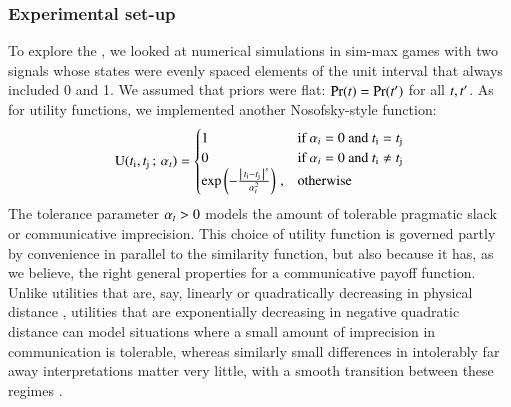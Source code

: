 \subsubsection{Experimental set-up}

To explore the \rdd, we looked at numerical simulations in sim-max
games with two signals whose states were evenly spaced elements of the
unit interval that always included 0 and 1. We assumed that priors
were flat: $\Pr(t) = \Pr(t')$ for all $t, t'$. As
for utility functions, we implemented another Nosofsky-style function:
\begin{align}
  \label{eq:NosofskyUtil}
  \mathrm{U}(t_{\mathrm{i}}, t_{\mathrm{j}} \thinspace ; \thinspace \alpha_t) =
      \begin{cases}
    1 & \textrm{if } \alpha_i = 0 \textrm{ and } t_{\mathrm{i}} = t_{\mathrm{j}} \\
    0 & \textrm{if } \alpha_i = 0 \textrm{ and } t_{\mathrm{i}} \neq t_{\mathrm{j}} \\
 \operatorname{exp} \left ( -  \frac{\left \lvert \, t_{\mathrm{i}} - t_{\mathrm{j}} \, \right\rvert^s}{ \alpha_t^2} \right ) \,,& \textrm{otherwise} \\
    \end{cases}
\end{align}
The tolerance parameter $\alpha_t > 0$ models the amount of tolerable
pragmatic slack or communicative imprecision. This choice of utility
function is governed partly by convenience in parallel to the
similarity function, but also because it has, as we believe, the right
general properties for a communicative payoff function. Unlike
utilities that are, say, linearly or quadratically decreasing in
physical distance \citep[as used
by][]{JagerMetzger2011:Voronoi-Languag,FrankeJager2010:Vagueness-Signa},
utilities that are exponentially decreasing in negative quadratic
distance can model situations where a small amount of imprecision in
communication is tolerable, whereas similarly small differences in
intolerably far away interpretations matter very little, with a smooth
transition between these regimes
\citep[c.f.][]{OConnor2013:The-Evolution-o}.

